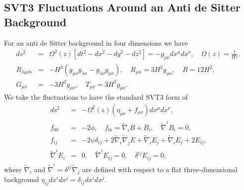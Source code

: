 \subsection{SVT3 Fluctuations Around an Anti de Sitter Background}
\label{ss:fluctuations_around_ads4}
For an anti de Sitter background in four dimensions we have
%
\begin{eqnarray}
ds^2 &=& \Omega^2(z)\left[ dt^2 - dx^2-dy^2-dz^2\right]= -g_{\mu\nu}dx^{\mu} dx^{\nu},\quad
\Omega(z) = \frac{1}{Hz},
\nonumber\\
R_{\lambda\mu\nu\kappa} &=& -H^2(g_{\mu\nu}g_{\lambda\kappa} -g_{\lambda\nu}g_{\mu\kappa}),
\quad R_{\mu\kappa} =3H^2 g_{\mu\kappa},\quad R = 12H^2,
\nonumber\\
G_{\mu\nu} &=& -3H^2 g_{\mu\nu},\quad T_{\mu\nu} = 3H^2 g_{\mu\nu}.
\label{14.1}
\end{eqnarray}
%
We take the fluctuations to have the standard SVT3 form of
%
\begin{eqnarray}
ds^2 &=&- \Omega^2(z)\left( \eta_{\mu\nu}+ f_{\mu\nu}\right) dx^\mu dx^\nu,
\nonumber\\
f_{00} &=& -2 \phi,\quad f_{0i} = \tilde\nabla_i B + B_i,\quad \tilde{\nabla}^iB_i=0,
\nonumber\\
f_{ij} &=& -2 \psi \delta_{ij} + 2\tilde\nabla_i\tilde\nabla_j E + \tilde\nabla_i E_j
+ \tilde\nabla_i E_j + 2E_{ij},
\nonumber\\
\tilde{\nabla}^iE_i&=&0,\quad \tilde{\nabla}^iE_{ij}=0,\quad \delta^{ij}E_{ij}=0, 
\label{14.2}
\end{eqnarray}
%
where $\tilde{\nabla}_i$ and $\tilde{\nabla}^i=\delta^{ij}\tilde{\nabla}_j$ are defined with respect to a flat three-dimensional background $\eta_{ij}dx^idx^j=\delta_{ij}dx^idx^j$.

